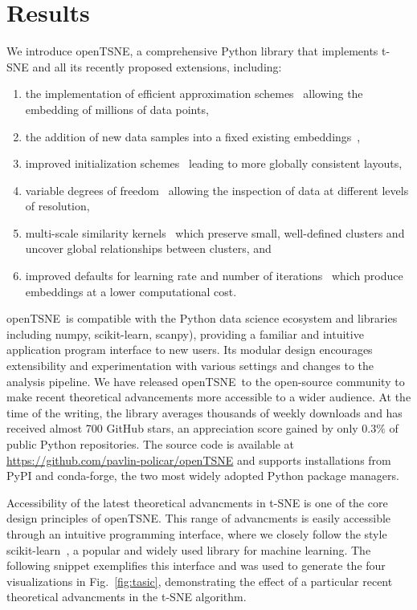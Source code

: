 \documentclass[letter]{article}
\newcommand{\opentsne}{\textsf{openTSNE}}
\begin{document}
\section*{Results}

We introduce \opentsne, a comprehensive Python library that implements t-SNE
and all its recently proposed extensions, including:
\begin{enumerate}
\item the implementation of efficient approximation 
	schemes~\cite{van2014accelerating,linderman2019fast} allowing the embedding
	of millions of data points,
\item the addition of new data samples into a fixed existing
	embeddings~\cite{policar2019embedding},
\item improved initialization schemes~\cite{kobak2019umap} leading to more
	globally consistent layouts,
\item variable degrees of freedom~\cite{kobak2019heavy} allowing the inspection
	of data at different levels of resolution,
\item multi-scale similarity kernels~\cite{kobak2019art} which preserve small,
	well-defined clusters and uncover global relationships between clusters,
	and
\item improved defaults for learning rate and number of
	iterations~\cite{belkina2019automated} which produce embeddings at a lower
	computational cost.
\end{enumerate}

\opentsne\ is compatible with the Python data science ecosystem and
libraries including \textsf{numpy}, \textsf{scikit-learn}, \textsf{scanpy}),
providing a familiar and intuitive application program interface to new
users. Its modular design encourages extensibility and experimentation with
various settings and changes to the analysis pipeline. We have released
\opentsne\ to the open-source community to make recent theoretical advancements
more accessible to a wider audience. At
the time of the writing, the library averages thousands of weekly
downloads and has received almost 700 GitHub stars, an appreciation score gained
by only $0.3\%$ of public Python repositories. The source code is available at
\url{https://github.com/pavlin-policar/openTSNE} and supports installations from
\textsf{PyPI} and \textsf{conda-forge}, the two most widely adopted Python
package managers.

Accessibility of the latest theoretical advancments in t-SNE is one of the core
design principles of \opentsne. This range of advancments is easily accessible through an intuitive
programming interface, where we closely follow the style
\textsf{scikit-learn}~\cite{sklearn_api}, a popular and widely used
library for machine learning. The following snippet exemplifies this interface
and was used to generate the four visualizations in Fig.~\ref{fig:tasic}, demonstrating the
effect of a particular recent theoretical advancments in the t-SNE algorithm. 
\end{document}

